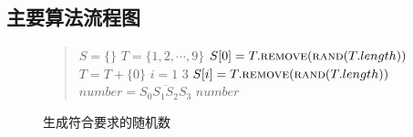 \subsection{主要算法流程图}

\begin{figure}[htp]
\begin{quote}
\begin{codebox}
\li $S = \{\}$
\li $T = \{1, 2, \cdots, 9\}$
\li $S[0] = T.\textnormal{\scshape remove}(\textnormal{\scshape rand}(T.length))$
\li $T = T + \{0\}$
\li \For $i = 1$ \To $3$ \Do
\li   $S[i] = T.\textnormal{\scshape remove}(\textnormal{\scshape rand}(T.length))$
	\End
\li $number = \overline{S_0S_1S_2S_3}$
\li \Return $number$
\end{codebox}
\end{quote}
\caption{\label{Number::genRand}生成符合要求的随机数}
\end{figure}


